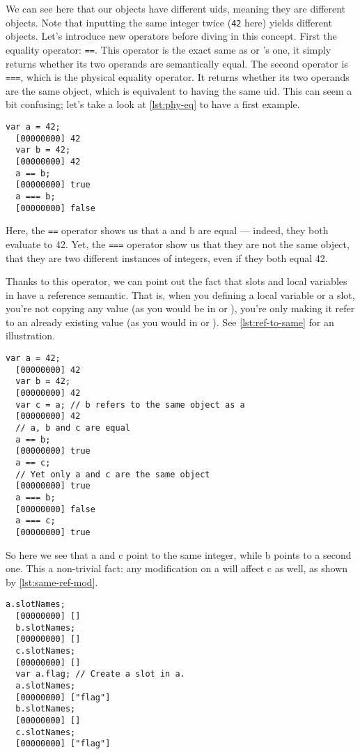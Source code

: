 \documentclass[openright,twoside,12pt]{report}
\newcommand{\lst}[1]{\autoref{lst:#1}}
\begin{document}
We can see here that our objects have different uids, meaning they are
different objects. Note that inputting the same integer twice
(\texttt{42} here) yields different objects. Let's introduce new
operators before diving in this concept. First the equality operator:
\texttt{==}. This operator is the exact same as \C or \Cxx's one, it
simply returns whether its two operands are semantically equal. The
second operator is \texttt{===}, which is the physical equality
operator. It returns whether its two operands are the same object,
which is equivalent to having the same uid. This can seem a bit
confusing; let's take a look at \lst{phy-eq} to have a first example.

\begin{lstlisting}[caption=Physical equality operator,
  label=lst:phy-eq]
  var a = 42;
  [00000000] 42
  var b = 42;
  [00000000] 42
  a == b;
  [00000000] true
  a === b;
  [00000000] false
\end{lstlisting}

Here, the \texttt{==} operator shows us that a and b are equal ---
indeed, they both evaluate to 42. Yet, the \texttt{===} operator show
us that they are not the same object, that they are two different
instances of integers, even if they both equal 42.

Thanks to this operator, we can point out the fact that slots and
local variables in \urbi have a reference semantic. That is, when you
defining a local variable or a slot, you're not copying any value (as
you would be in \C or \Cxx), you're only making it refer to an already
existing value (as you would in \ruby or \java). See \lst{ref-to-same}
for an illustration.

\begin{lstlisting}[caption=Two references to the same object,
  label=lst:ref-to-same]
  var a = 42;
  [00000000] 42
  var b = 42;
  [00000000] 42
  var c = a; // b refers to the same object as a
  [00000000] 42
  // a, b and c are equal
  a == b;
  [00000000] true
  a == c;
  // Yet only a and c are the same object
  [00000000] true
  a === b;
  [00000000] false
  a === c;
  [00000000] true
\end{lstlisting}

So here we see that a and c point to the same integer, while b points
to a second one. This a non-trivial fact: any modification on a will
affect c as well, as shown by \lst{same-ref-mod}.

\begin{lstlisting}[caption=Shared modification,
  label=lst:same-ref-mod]
  a.slotNames;
  [00000000] []
  b.slotNames;
  [00000000] []
  c.slotNames;
  [00000000] []
  var a.flag; // Create a slot in a.
  a.slotNames;
  [00000000] ["flag"]
  b.slotNames;
  [00000000] []
  c.slotNames;
  [00000000] ["flag"]
\end{lstlisting}
\end{document}
